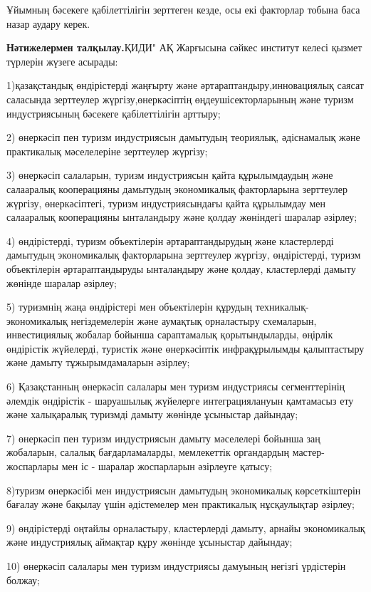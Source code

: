 Ұйымның бәсекеге қабілеттілігін зерттеген кезде, осы екі факторлар
тобына баса назар аудару керек.

{\bfseries Нәтижелермен талқылау.}ҚИДИ" АҚ Жарғысына сәйкес институт келесі
қызмет түрлерін жүзеге асырады:

1)қазақстандық өндірістерді жаңғырту және әртараптандыру,инновациялық
саясат саласында зерттеулер жүргізу,өнеркәсіптің өңдеушісекторларының
және туризм индустриясының бәсекеге қабілеттілігін арттыру;

2) өнеркәсіп пен туризм индустриясын дамытудың теориялық, әдіснамалық
және практикалық мәселелеріне зерттеулер жүргізу;

3) өнеркәсіп салаларын, туризм индустриясын қайта құрылымдаудың және
салааралық кооперацияны дамытудың экономикалық факторларына зерттеулер
жүргізу, өнеркәсіптегі, туризм индустриясындағы қайта құрылымдау мен
салааралық кооперацияны ынталандыру және қолдау жөніндегі шаралар
әзірлеу;

4) өндірістерді, туризм объектілерін әртараптандырудың және кластерлерді
дамытудың экономикалық факторларына зерттеулер жүргізу, өндірістерді,
туризм объектілерін әртараптандыруды ынталандыру және қолдау,
кластерлерді дамыту жөнінде шаралар әзірлеу;

5) туризмнің жаңа өндірістері мен объектілерін құрудың
техникалық-экономикалық негіздемелерін және аумақтық орналастыру
схемаларын, инвестициялық жобалар бойынша сараптамалық қорытындыларды,
өңірлік өндірістік жүйелерді, туристік және өнеркәсіптік инфрақұрылымды
қалыптастыру және дамыту тұжырымдамаларын әзірлеу;

6) Қазақстанның өнеркәсіп салалары мен туризм индустриясы сегменттерінің
әлемдік өндірістік - шаруашылық жүйелерге интеграциялануын қамтамасыз
ету және халықаралық туризмді дамыту жөнінде ұсыныстар дайындау;

7) өнеркәсіп пен туризм индустриясын дамыту мәселелері бойынша заң
жобаларын, салалық бағдарламаларды, мемлекеттік органдардың
мастер-жоспарлары мен іс - шаралар жоспарларын әзірлеуге қатысу;

8)туризм өнеркәсібі мен индустриясын дамытудың экономикалық
көрсеткіштерін бағалау және бақылау үшін әдістемелер мен практикалық
нұсқаулықтар әзірлеу;

9) өндірістерді оңтайлы орналастыру, кластерлерді дамыту, арнайы
экономикалық және индустриялық аймақтар құру жөнінде ұсыныстар дайындау;

10) өнеркәсіп салалары мен туризм индустриясы дамуының негізгі
үрдістерін болжау;

